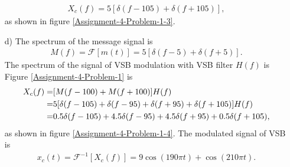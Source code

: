 \documentclass{assignment}
\begin{document}
\begin{sol}
\begin{itemize}
\begin{align}
            X_c(f)=5[\delta(f-105)+\delta(f+105)],
        \end{align}
        as shown in figure \ref{Assignment-4-Problem-1-3}.
        \item[d)] The spectrum of the message signal is
        \begin{align}
            M(f)=\mathscr{F}[m(t)]=5[\delta(f-5)+\delta(f+5)].
        \end{align}
        The spectrum of the signal of VSB modulation with VSB filter $H(f)$ is Figure \ref{Assignment-4-Problem-1} is
        \begin{align}
            \notag X_c(f)=&[M(f-100)+M(f+100)]H(f)\\
            \notag=&5[\delta(f-105)+\delta(f-95)+\delta(f+95)+\delta(f+105)]H(f)\\
            =&0.5\delta(f-105)+4.5\delta(f-95)+4.5\delta(f+95)+0.5\delta(f+105),
        \end{align}
        as shown in figure \ref{Assignment-4-Problem-1-4}.
        The modulated signal of VSB is
        \begin{align}
            x_c(t)=\mathscr{F}^{-1}[X_c(f)]=9\cos(190\pi t)+\cos(210\pi t).
        \end{align}
        \begin{figure}[h]
            \centering
\end{figure}
\end{itemize}
\end{sol}
\end{document}

